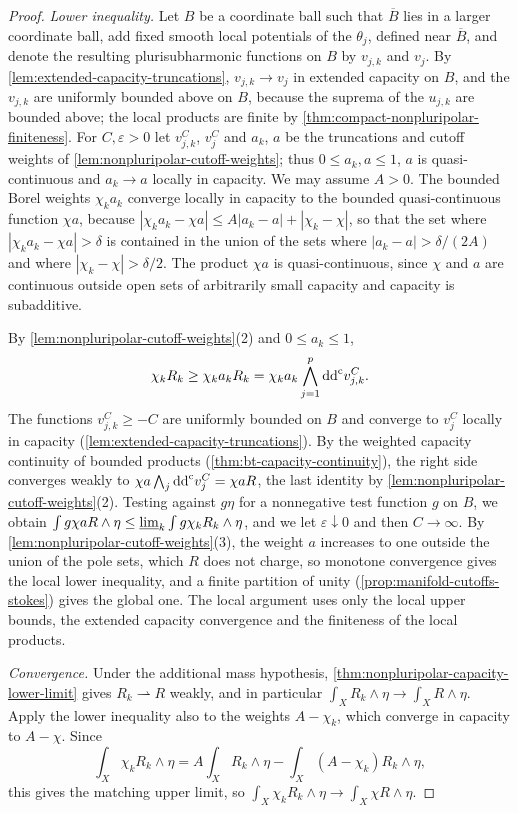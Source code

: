\begin{proof}
\emph{Lower inequality.} Let $B$ be a coordinate ball such that $\overline B$ lies in a larger coordinate ball, add fixed smooth local potentials of the $\theta_j$, defined near $\overline B$, and denote the resulting plurisubharmonic functions on $B$ by $v_{j,k}$ and $v_j$. By \cref{lem:extended-capacity-truncations}, $v_{j,k}\to v_j$ in extended capacity on $B$, and the $v_{j,k}$ are uniformly bounded above on $B$, because the suprema of the $u_{j,k}$ are bounded above; the local products are finite by \cref{thm:compact-nonpluripolar-finiteness}. For $C,\varepsilon>0$ let $v_{j,k}^C$, $v_j^C$ and $a_k$, $a$ be the truncations and cutoff weights of \cref{lem:nonpluripolar-cutoff-weights}; thus $0\leq a_k,a\leq1$, $a$ is quasi-continuous and $a_k\to a$ locally in capacity. We may assume $A>0$. The bounded Borel weights $\chi_ka_k$ converge locally in capacity to the bounded quasi-continuous function $\chi a$, because $|\chi_ka_k-\chi a|\leq A|a_k-a|+|\chi_k-\chi|$, so that the set where $|\chi_ka_k-\chi a|>\delta$ is contained in the union of the sets where $|a_k-a|>\delta/(2A)$ and where $|\chi_k-\chi|>\delta/2$. The product $\chi a$ is quasi-continuous, since $\chi$ and $a$ are continuous outside open sets of arbitrarily small capacity and capacity is subadditive.

By \cref{lem:nonpluripolar-cutoff-weights}(2) and $0\leq a_k\leq1$,
\[
 \chi_kR_k\geq\chi_ka_kR_k
              =\chi_ka_k\bigwedge_{j=1}^p\mathrm{dd}^{\mathrm{c}} v_{j,k}^C.
\]
The functions $v_{j,k}^C\geq-C$ are uniformly bounded on $B$ and converge to $v_j^C$ locally in capacity (\cref{lem:extended-capacity-truncations}). By the weighted capacity continuity of bounded products (\cref{thm:bt-capacity-continuity}), the right side converges weakly to $\chi a\bigwedge_j\mathrm{dd}^{\mathrm{c}} v_j^C=\chi aR$, the last identity by \cref{lem:nonpluripolar-cutoff-weights}(2). Testing against $g\eta$ for a nonnegative test function $g$ on $B$, we obtain $\int g\chi aR\wedge\eta\leq\varliminf_k\int g\chi_kR_k\wedge\eta$, and we let $\varepsilon\downarrow0$ and then $C\to\infty$. By \cref{lem:nonpluripolar-cutoff-weights}(3), the weight $a$ increases to one outside the union of the pole sets, which $R$ does not charge, so monotone convergence gives the local lower inequality, and a finite partition of unity (\cref{prop:manifold-cutoffs-stokes}) gives the global one. The local argument uses only the local upper bounds, the extended capacity convergence and the finiteness of the local products.

\emph{Convergence.} Under the additional mass hypothesis, \cref{thm:nonpluripolar-capacity-lower-limit} gives $R_k\rightharpoonup R$ weakly, and in particular $\int_XR_k\wedge\eta\to\int_XR\wedge\eta$. Apply the lower inequality also to the weights $A-\chi_k$, which converge in capacity to $A-\chi$. Since
\[
 \int_X\chi_kR_k\wedge\eta
       =A\int_XR_k\wedge\eta
                     -\int_X(A-\chi_k)R_k\wedge\eta,
\]
this gives the matching upper limit, so $\int_X\chi_kR_k\wedge\eta\to\int_X\chi R\wedge\eta$.


\end{proof}
